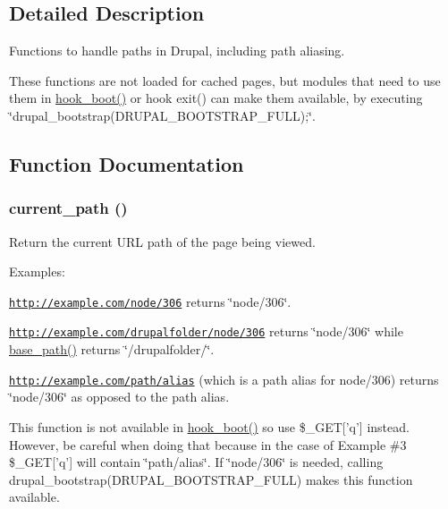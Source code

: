 \subsection{Detailed Description}
Functions to handle paths in Drupal, including path aliasing.

These functions are not loaded for cached pages, but modules that need to use them in \hyperlink{group__hooks_ga9ac1dfffdc69471a3d00d67503c71577}{hook\_\-boot()} or hook exit() can make them available, by executing \char`\"{}drupal\_\-bootstrap(DRUPAL\_\-BOOTSTRAP\_\-FULL);\char`\"{}. 

\subsection{Function Documentation}
\hypertarget{path_8inc_a97aaa03027cbf6f0ffdd9a4bf5c9a31c}{
\subsubsection[{current\_\-path}]{\setlength{\rightskip}{0pt plus 5cm}current\_\-path ()}}
\label{path_8inc_a97aaa03027cbf6f0ffdd9a4bf5c9a31c}
Return the current URL path of the page being viewed.

Examples:
\begin{DoxyItemize}
\item \href{http://example.com/node/306}{\tt http://example.com/node/306} returns \char`\"{}node/306\char`\"{}.
\item \href{http://example.com/drupalfolder/node/306}{\tt http://example.com/drupalfolder/node/306} returns \char`\"{}node/306\char`\"{} while \hyperlink{common_8inc_ae227697e9c239f09fd7e36f71afde771}{base\_\-path()} returns \char`\"{}/drupalfolder/\char`\"{}.
\item \href{http://example.com/path/alias}{\tt http://example.com/path/alias} (which is a path alias for node/306) returns \char`\"{}node/306\char`\"{} as opposed to the path alias.
\end{DoxyItemize}

This function is not available in \hyperlink{group__hooks_ga9ac1dfffdc69471a3d00d67503c71577}{hook\_\-boot()} so use \$\_\-GET\mbox{[}'q'\mbox{]} instead. However, be careful when doing that because in the case of Example \#3 \$\_\-GET\mbox{[}'q'\mbox{]} will contain \char`\"{}path/alias\char`\"{}. If \char`\"{}node/306\char`\"{} is needed, calling drupal\_\-bootstrap(DRUPAL\_\-BOOTSTRAP\_\-FULL) makes this function available.

